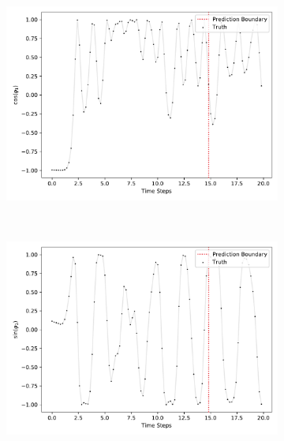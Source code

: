 		\begin{figure}
			\centering
			\begin{subfigure}{0.5\linewidth}
				\centering
				\includegraphics[width=\linewidth]{figures/experiments/environments/observations-acrobot-gym-N0-D0.pdf}
			\end{subfigure}%
			~
			\begin{subfigure}{0.5\linewidth}
				\centering
				\includegraphics[width=\linewidth]{figures/experiments/environments/observations-acrobot-gym-N0-D1.pdf}
			\end{subfigure} \\
			\begin{subfigure}{0.5\linewidth}
				\centering

\end{subfigure}
\end{figure}
